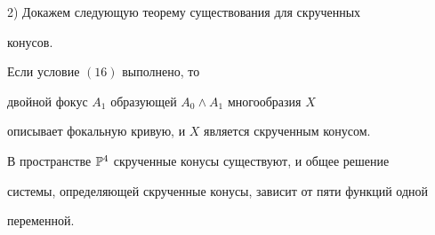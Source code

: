 2) Докажем следующую теорему существования для скрученных


конусов.





\begin{thm} Если условие $(16)$ выполнено, то


двойной фокус $A_1$ образующей $A_0 \wedge A_1$ многообразия $X$


описывает фокальную кривую, и  $X$ является скрученным конусом.


В пространстве $\Bbb P^4$ скрученные конусы существуют, и общее решение


системы, определяющей скрученные конусы, зависит от пяти функций одной


переменной.


\end{thm}





